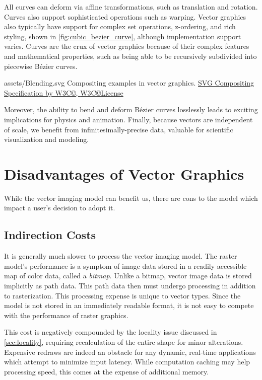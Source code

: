 All curves can deform via affine transformations, such as translation and rotation. Curves also support sophisticated operations such as warping. Vector graphics also typically have support for complex set operations, z-ordering, and rich styling\cite{Barr84}, shown in \cref{fig:cubic_bezier_curve}, although implementation support varies. Curves are the crux of vector graphics because of their complex features and mathematical properties, such as being able to be recursively subdivided into piecewise Bézier curves.\medskip

\widesvg
{assets/Blending.svg}
{\label{fig:compositing}Compositing examples in vector graphics.}
{\href{https://dev.w3.org/SVG/modules/compositing/master/Overview.html}{SVG Compositing Specification by W3C\copyright, \href{https://www.w3.org/Consortium/Legal/2015/copyright-software-and-document}{W3C\copyright License}}}\medskip

Moreover, the ability to bend and deform Bézier curves losslessly leads to exciting implications for physics and animation. Finally, because vectors are independent of scale, we benefit from infinitesimally-precise data, valuable for scientific visualization and modeling.

\section{Disadvantages of Vector Graphics}
While the vector imaging model can benefit us, there are cons to the model which impact a user's decision to adopt it.

\subsection{Indirection Costs}
It is generally much slower to process the vector imaging model. The raster model's performance is a symptom of image data stored in a readily accessible map of color data, called a \textit{bitmap}. Unlike a bitmap, vector image data is stored implicitly as path data. This path data then must undergo processing in addition to rasterization. This processing expense is unique to vector types. Since the model is not stored in an immediately readable format, it is not easy to compete with the performance of raster graphics.\medskip

This cost is negatively compounded by the locality issue discussed in \cref{sec:locality}, requiring recalculation of the entire shape for minor alterations. Expensive redraws are indeed an obstacle for any dynamic, real-time applications which attempt to minimize input latency. While computation caching may help processing speed, this comes at the expense of additional memory.

